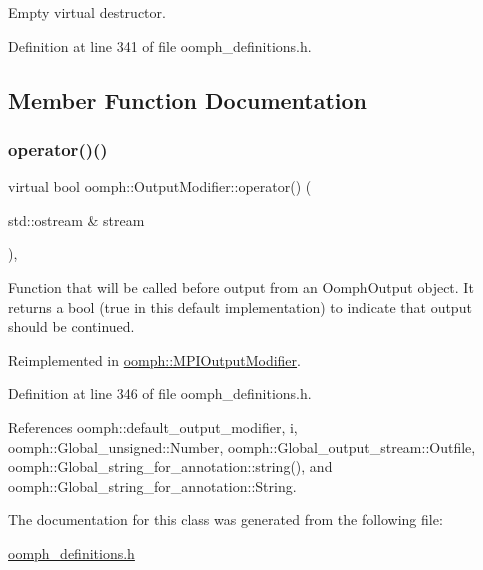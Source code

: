Empty virtual destructor. 



Definition at line 341 of file oomph\+\_\+definitions.\+h.



\subsection{Member Function Documentation}
\mbox{\label{classoomph_1_1OutputModifier_ae2d5a2d19865858377b5113ca84aa423}} 
\subsubsection{\texorpdfstring{operator()()}{operator()()}}
{\footnotesize\ttfamily virtual bool oomph\+::\+Output\+Modifier\+::operator() (\begin{DoxyParamCaption}\item[{std\+::ostream \&}]{stream }\end{DoxyParamCaption})\hspace{0.3cm}{\ttfamily [inline]}, {\ttfamily [virtual]}}



Function that will be called before output from an Oomph\+Output object. It returns a bool (true in this default implementation) to indicate that output should be continued. 



Reimplemented in \hyperlink{classoomph_1_1MPIOutputModifier_a982af85269a497f384cdff7baf9487a1}{oomph\+::\+M\+P\+I\+Output\+Modifier}.



Definition at line 346 of file oomph\+\_\+definitions.\+h.



References oomph\+::default\+\_\+output\+\_\+modifier, i, oomph\+::\+Global\+\_\+unsigned\+::\+Number, oomph\+::\+Global\+\_\+output\+\_\+stream\+::\+Outfile, oomph\+::\+Global\+\_\+string\+\_\+for\+\_\+annotation\+::string(), and oomph\+::\+Global\+\_\+string\+\_\+for\+\_\+annotation\+::\+String.



The documentation for this class was generated from the following file\+:\begin{DoxyCompactItemize}
\item 
\hyperlink{oomph__definitions_8h}{oomph\+\_\+definitions.\+h}\end{DoxyCompactItemize}
